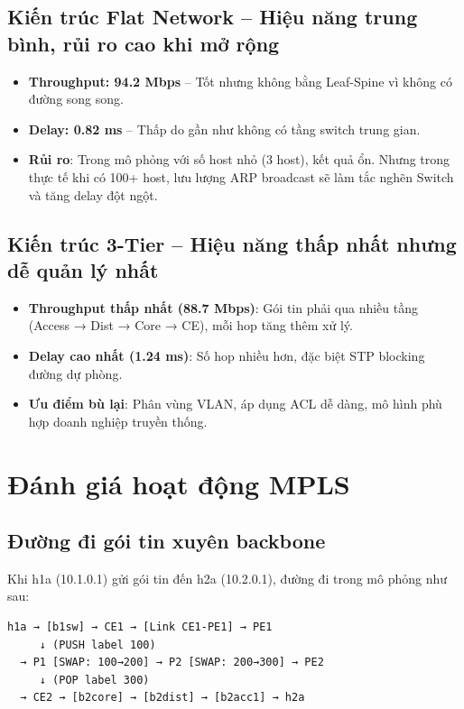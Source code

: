 \subsection{Kiến trúc Flat Network – Hiệu năng trung bình, rủi ro cao khi mở rộng}

\begin{itemize}
    \item \textbf{Throughput: 94.2 Mbps} – Tốt nhưng không bằng Leaf-Spine vì không có đường song song.
    \item \textbf{Delay: 0.82 ms} – Thấp do gần như không có tầng switch trung gian.
    \item \textbf{Rủi ro}: Trong mô phỏng với số host nhỏ (3 host), kết quả ổn. Nhưng trong thực tế khi có 100+ host, lưu lượng ARP broadcast sẽ làm tắc nghẽn Switch và tăng delay đột ngột.
\end{itemize}

\subsection{Kiến trúc 3-Tier – Hiệu năng thấp nhất nhưng dễ quản lý nhất}

\begin{itemize}
    \item \textbf{Throughput thấp nhất (88.7 Mbps)}: Gói tin phải qua nhiều tầng (Access → Dist → Core → CE), mỗi hop tăng thêm xử lý.
    \item \textbf{Delay cao nhất (1.24 ms)}: Số hop nhiều hơn, đặc biệt STP blocking đường dự phòng.
    \item \textbf{Ưu điểm bù lại}: Phân vùng VLAN, áp dụng ACL dễ dàng, mô hình phù hợp doanh nghiệp truyền thống.
\end{itemize}

\section{Đánh giá hoạt động MPLS}

\subsection{Đường đi gói tin xuyên backbone}

Khi h1a (10.1.0.1) gửi gói tin đến h2a (10.2.0.1), đường đi trong mô phỏng như sau:

\begin{verbatim}
h1a → [b1sw] → CE1 → [Link CE1-PE1] → PE1
     ↓ (PUSH label 100)
  → P1 [SWAP: 100→200] → P2 [SWAP: 200→300] → PE2
     ↓ (POP label 300)
  → CE2 → [b2core] → [b2dist] → [b2acc1] → h2a
\end{verbatim}

